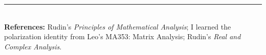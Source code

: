 \documentclass[11pt]{article}
\begin{document}
\hrule
$\,$\\
\noindent \textbf{References:} Rudin's \textit{Principles of Mathematical Analysis}; I learned the polarization identity from Leo's MA353: Matrix Analysis; Rudin's \textit{Real and Complex Analysis}.
\end{document}
